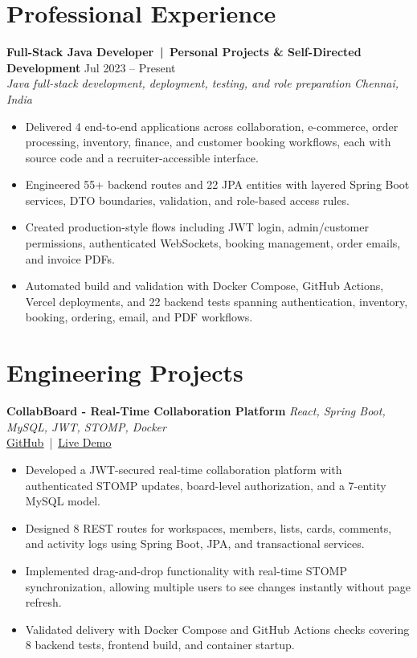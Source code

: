 \documentclass[a4paper,10pt]{article}
\newcommand{\resumeItem}[1]{\item \small{#1}}
\newcommand{\resumeLink}[2]{\href{#1}{\textcolor{linkblue}{\underline{#2}}}}
\newcommand{\projectHeader}[4]{
  \vspace{4pt}
  \textbf{#1} \hfill {\small \emph{#2}} \\
  {\footnotesize #3}
  \vspace{-1pt}
}
\newcommand{\roleHeader}[4]{
  \textbf{#1} \hfill {\small #2} \\
  \textit{\small #3} \hfill \textit{\small #4}
  \vspace{-1pt}
}
\begin{document}
\section*{Professional Experience}
\roleHeader
  {Full-Stack Java Developer \,|\, Personal Projects \& Self-Directed Development}
  {Jul 2023 -- Present}
  {Java full-stack development, deployment, testing, and role preparation}
  {Chennai, India}
\begin{itemize}
  \resumeItem{Delivered 4 end-to-end applications across collaboration, e-commerce, order processing, inventory, finance, and customer booking workflows, each with source code and a recruiter-accessible interface.}
  \resumeItem{Engineered 55+ backend routes and 22 JPA entities with layered Spring Boot services, DTO boundaries, validation, and role-based access rules.}
  \resumeItem{Created production-style flows including JWT login, admin/customer permissions, authenticated WebSockets, booking management, order emails, and invoice PDFs.}
  \resumeItem{Automated build and validation with Docker Compose, GitHub Actions, Vercel deployments, and 22 backend tests spanning authentication, inventory, booking, ordering, email, and PDF workflows.}
\end{itemize}
\vspace{0pt}

\section*{Engineering Projects}

\projectHeader
  {CollabBoard - Real-Time Collaboration Platform}
  {React, Spring Boot, MySQL, JWT, STOMP, Docker}
  {\resumeLink{https://github.com/SURYAPRAKASH123671/collabboard}{GitHub} \,|\, \resumeLink{https://collabboard-silk.vercel.app/}{Live Demo}}
  {}
\begin{itemize}
  \resumeItem{Developed a JWT-secured real-time collaboration platform with authenticated STOMP updates, board-level authorization, and a 7-entity MySQL model.}
  \resumeItem{Designed 8 REST routes for workspaces, members, lists, cards, comments, and activity logs using Spring Boot, JPA, and transactional services.}
  \resumeItem{Implemented drag-and-drop functionality with real-time STOMP synchronization, allowing multiple users to see changes instantly without page refresh.}
  \resumeItem{Validated delivery with Docker Compose and GitHub Actions checks covering 8 backend tests, frontend build, and container startup.}
\end{itemize}
\vspace{2pt}
\end{document}

